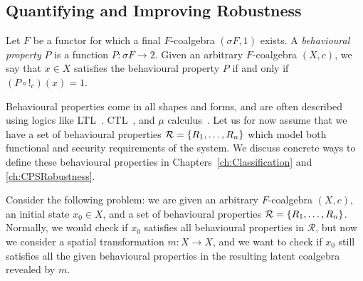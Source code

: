 


\subsection{Quantifying and Improving Robustness}
\label{sec:Latent:Robustness}
\begin{definition}
    \label{def:Latent:BehaviouralProperty}
    Let $F$ be a functor for which a final $F$-coalgebra $(\sigma F, 1)$ exists. A \emph{behavioural property} $P$ is a function $P\colon \sigma F\rightarrow 2$. Given an arbitrary $F$-coalgebra $(X,c)$, we say that $x\in X$ satisfies the behavioural property $P$ if and only if $(P\circ !_c)(x)=1$.
\end{definition}
Behavioural properties come in all shapes and forms, and are often described using logics like LTL~\cite{LTL}. CTL~\cite{CTL}, and $\mu$ calculus~\cite{MuCalculus}. Let us for now assume that we have a set of behavioural properties $\mathcal{R}=\left\{R_1, \ldots, R_n\right\}$ which model both functional and security requirements of the system. We discuss concrete ways to define these behavioural properties in Chapters~\ref{ch:Classification} and \ref{ch:CPSRobustness}.

Consider the following problem: we are given an arbitrary $F$-coalgebra $(X,c)$, an initial state $x_0\in X$, and a set of behavioural properties $\mathcal{R}=\left\{R_1, \ldots, R_n\right\}$. Normally, we would check if $x_0$ satisfies all behavioural properties in $\mathcal{R}$, but now we consider a spatial transformation $m\colon X\rightarrow X$, and we want to check if $x_0$ still satisfies all the given behavioural properties in the resulting latent coalgebra revealed by $m$.

